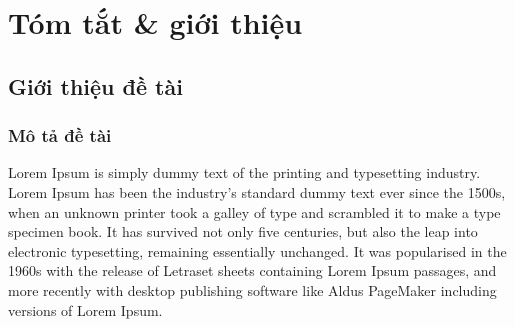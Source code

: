 \chapter{Tóm tắt \& giới thiệu}
\minitoc
\newpage
\section{Giới thiệu đề tài}
\subsection{Mô tả đề tài}

Lorem Ipsum is simply dummy text of the printing and typesetting industry. Lorem Ipsum has been the industry's standard dummy text ever since the 1500s, when an unknown printer took a galley of type and scrambled it to make a type specimen book. It has survived not only five centuries, but also the leap into electronic typesetting, remaining essentially unchanged. It was popularised in the 1960s with the release of Letraset sheets containing Lorem Ipsum passages, and more recently with desktop publishing software like Aldus PageMaker including versions of Lorem Ipsum.
